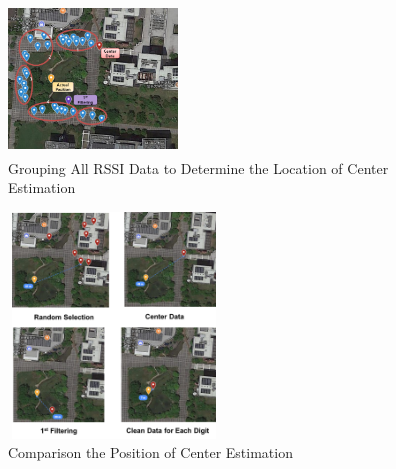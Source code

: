 \documentclass[twocolumn,10pt]{asme2ej}
\begin{document}
	\begin{figure}[t]
		\begin{center}
			\setlength{\unitlength}{0.012500in}%
			\includegraphics[width=0.4\textwidth,height=40mm]{GroupingData.png}
		\end{center}
		\caption{Grouping All RSSI Data to Determine the Location of Center Estimation}
		\label{Experiment Route} 
	\end{figure}
	
	
	\begin{figure}[t]
		\begin{center}
			\setlength{\unitlength}{0.012500in}%
			\includegraphics[width=0.5\textwidth,height=60mm]{ComparisonMethod.png}
		\end{center}
		\caption{Comparison the Position of Center Estimation}
		\label{Experiment Route} 
	\end{figure}
	
\end{document}
